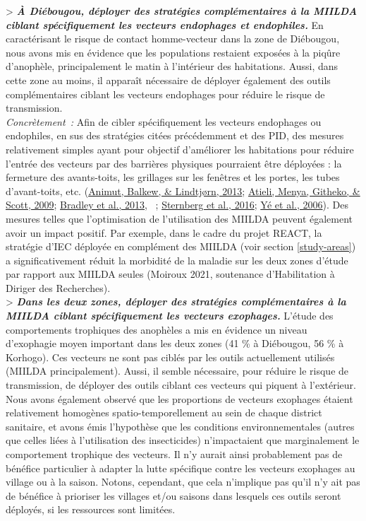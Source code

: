 \documentclass[12pt,twoside]{reedthesis}
\begin{document}
\textgreater{} \textbf{\emph{À Diébougou, déployer des stratégies complémentaires à la MIILDA ciblant spécifiquement les vecteurs endophages et endophiles.}} En caractérisant le risque de contact homme-vecteur dans la zone de Diébougou, nous avons mis en évidence que les populations restaient exposées à la piqûre d'anophèle, principalement le matin à l'intérieur des habitations. Aussi, dans cette zone au moins, il apparaît nécessaire de déployer également des outils complémentaires ciblant les vecteurs endophages pour réduire le risque de transmission.\\

\emph{Concrètement~:} Afin de cibler spécifiquement les vecteurs endophages ou endophiles, en sus des stratégies citées précédemment et des PID, des mesures relativement simples ayant pour objectif d'améliorer les habitations pour réduire l'entrée des vecteurs par des barrières physiques pourraient être déployées : la fermeture des avants-toits, les grillages sur les fenêtres et les portes, les tubes d'avant-toits, etc. (\protect\hyperlink{ref-animut_impact_2013}{Animut, Balkew, \& Lindtjørn, 2013}; \protect\hyperlink{ref-atieli_house_2009}{Atieli, Menya, Githeko, \& Scott, 2009}; \protect\hyperlink{ref-bradley_reduced_2013}{Bradley et al., 2013}, ~; \protect\hyperlink{ref-sternberg_eave_2016}{Sternberg et al., 2016}; \protect\hyperlink{ref-ye_housing_2006}{Yé et al., 2006}). Des mesures telles que l'optimisation de l'utilisation des MIILDA peuvent également avoir un impact positif. Par exemple, dans le cadre du projet REACT, la stratégie d'IEC déployée en complément des MIILDA (voir section \ref{study-areas}) a significativement réduit la morbidité de la maladie sur les deux zones d'étude par rapport aux MIILDA seules (Moiroux 2021, soutenance d'Habilitation à Diriger des Recherches).\\

\textgreater{} \textbf{\emph{Dans les deux zones, déployer des stratégies complémentaires à la MIILDA ciblant spécifiquement les vecteurs exophages.}} L'étude des comportements trophiques des anophèles a mis en évidence un niveau d'exophagie moyen important dans les deux zones (41 \% à Diébougou, 56 \% à Korhogo). Ces vecteurs ne sont pas ciblés par les outils actuellement utilisés (MIILDA principalement). Aussi, il semble nécessaire, pour réduire le risque de transmission, de déployer des outils ciblant ces vecteurs qui piquent à l'extérieur. Nous avons également observé que les proportions de vecteurs exophages étaient relativement homogènes spatio-temporellement au sein de chaque district sanitaire, et avons émis l'hypothèse que les conditions environnementales (autres que celles liées à l'utilisation des insecticides) n'impactaient que marginalement le comportement trophique des vecteurs. Il n'y aurait ainsi probablement pas de bénéfice particulier à adapter la lutte spécifique contre les vecteurs exophages au village ou à la saison. Notons, cependant, que cela n'implique pas qu'il n'y ait pas de bénéfice à prioriser les villages et/ou saisons dans lesquels ces outils seront déployés, si les ressources sont limitées.\\
\end{document}
